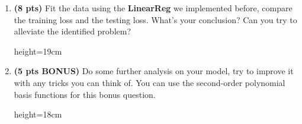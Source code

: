 \begin{enumerate}
\begin{soln}{height=19cm}
    \end{soln}
    \clearpage
    \item \textbf{(8 pts)} Fit the data using the \textbf{LinearReg} we implemented before, compare the training loss and the testing loss. What's your conclusion? Can you try to alleviate the identified problem?
    \begin{soln}{height=19cm}
    \end{soln}
    \clearpage
    \item \textbf{(5 pts BONUS)} Do some further analysis on your model, try to improve it with any tricks you can think of. You can use the second-order polynomial basis functions for this bonus question.
    \begin{soln}{height=18cm}
    \end{soln}
\end{enumerate}           





